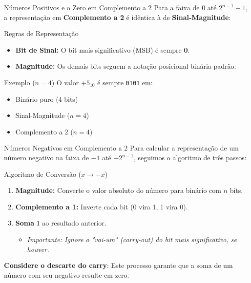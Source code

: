 \begin{frame}{Números Positivos e o Zero em Complemento a 2}
    Para a faixa de $0$ até $2^{n-1}-1$, a representação em \textbf{Complemento a 2} é idêntica à de \textbf{Sinal-Magnitude}:

    \begin{block}{Regras de Representação}
        \begin{itemize}
            \item \textbf{Bit de Sinal:} O bit mais significativo (MSB) é sempre \textbf{0}.
            \item \textbf{Magnitude:} Os demais bits seguem a notação posicional binária padrão.
        \end{itemize}
    \end{block}



    \begin{exampleblock}{Exemplo ($n=4$)}
        O valor $+5_{10}$ é sempre \texttt{0101} em:
        \begin{itemize}
            \item Binário puro (4 bits)
            \item Sinal-Magnitude ($n=4$)
            \item Complemento a 2 ($n=4$)
        \end{itemize}
    \end{exampleblock}
\end{frame}
\begin{frame}{Números Negativos  em Complemento a 2}
    Para calcular a representação de um número negativo na faixa de $-1$ até $-2^{n-1}$, seguimos o algoritmo de três passos:

    \begin{alertblock}{Algoritmo de Conversão ($x \rightarrow -x$)}
        \begin{enumerate}
            \item \textbf{Magnitude:} Converte o valor absoluto do número para binário com $n$ bits.
            \item \textbf{Complemento a 1:} Inverte cada bit (0 vira 1, 1 vira 0).
            \item \textbf{Soma}  $1$ ao resultado anterior.
                  \begin{itemize}
                      \item \textit{Importante: Ignore o "vai-um" (carry-out) do bit mais significativo, se houver.}
                  \end{itemize}
        \end{enumerate}
    \end{alertblock}

    \textbf{Considere o descarte do carry}: Este processo garante que a soma de um número com seu negativo resulte em zero.
\end{frame}

